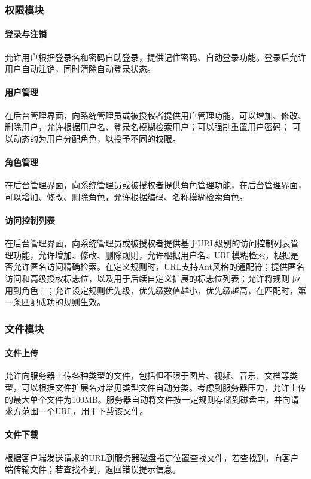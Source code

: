 \documentclass[titlepage,UTF8,linespread=1.5]{ctexart}
\begin{document}
\subsubsection{权限模块}
\paragraph{登录与注销}
允许用户根据登录名和密码自助登录，提供记住密码、自动登录功能。登录后允许用户自动注销，同时清除自动登录状态。\par
\paragraph{用户管理}
在后台管理界面，向系统管理员或被授权者提供用户管理功能，可以增加、修改、删除用户，允许根据用户名、登录名模糊检索用户；可以强制重置用户密码；
可以动态的为用户分配角色，以授予不同的权限。\par
\paragraph{角色管理}
在后台管理界面，向系统管理员或被授权者提供角色管理功能，在后台管理界面，可以增加、修改、删除角色，允许根据编码、名称模糊检索角色。\par
\paragraph{访问控制列表}
在后台管理界面，向系统管理员或被授权者提供基于URL级别的访问控制列表管理功能，允许增加、修改、删除规则，允许根据用户名、URL模糊检索，根据是
否允许匿名访问精确检索。在定义规则时，URL支持Ant风格的通配符；提供匿名访问和高级授权标志位，以及用于后续自定义扩展的标志位列表；允许将规则
应用到角色上；允许设定规则优先级，优先级数值越小，优先级越高，在匹配时，第一条匹配成功的规则生效。\par

\subsubsection{文件模块}
\paragraph{文件上传}
允许向服务器上传各种类型的文件，包括但不限于图片、视频、音乐、文档等类型，可以根据文件扩展名对常见类型文件自动分类。考虑到服务器压力，允许上传
的最大单个文件为100MB。服务器自动将文件按一定规则存储到磁盘中，并向请求方范围一个URL，用于下载该文件。\par
\paragraph{文件下载}
根据客户端发送请求的URL到服务器磁盘指定位置查找文件，若查找到，向客户端传输文件；若查找不到，返回错误提示信息。\par
\end{document}
